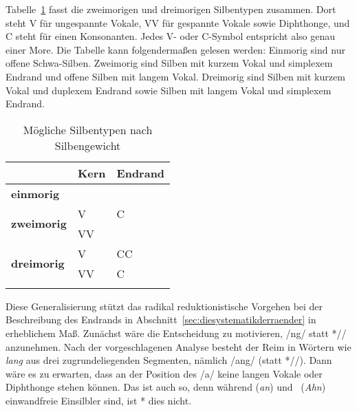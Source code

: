 
Tabelle~\ref{tab:einsilblerundzweisilbler147} fasst die zweimorigen und dreimorigen Silbentypen zusammen.
Dort steht V für ungespannte Vokale, VV für gespannte Vokale sowie Diphthonge, und C steht für einen Konsonanten.
Jedes V- oder C-Symbol entspricht also genau einer More.
Die Tabelle kann folgendermaßen gelesen werden:
Einmorig sind nur offene Schwa-Silben.
Zweimorig sind Silben mit kurzem Vokal und simplexem Endrand und offene Silben mit langem Vokal.
Dreimorig sind Silben mit kurzem Vokal und duplexem Endrand sowie Silben mit langem Vokal und simplexem Endrand.

\begin{table}[!htbp]
  \centering
  \begin{tabular}{lll}
    \lsptoprule
     & \textbf{Kern} & \textbf{Endrand} \\
    \midrule
    \textbf{einmorig} & \textipa{@} & \\
    \midrule
    \multirow{2}{*}{\textbf{zweimorig}} & V & C \\
    & VV & \\
    \midrule
    \multirow{2}{*}{\textbf{dreimorig}} & V & CC \\
    & VV & C \\
    \lspbottomrule
  \end{tabular}
  \caption{Mögliche Silbentypen nach Silbengewicht}
  \label{tab:einsilblerundzweisilbler147}
\end{table}

Diese Generalisierung stützt das radikal reduktionistische Vorgehen bei der Beschreibung des Endrands in Abschnitt~\ref{sec:diesystematikderraender} in erheblichem Maß.
Zunächst wäre die Entscheidung zu motivieren, /ng/ statt *// anzunehmen.
Nach der vorgeschlagenen Analyse besteht der Reim in Wörtern wie \textit{lang} aus drei zugrundeliegenden Segmenten, nämlich /ang/ (statt *//).
Dann wäre es zu erwarten, dass an der Position des /a/ keine langen Vokale oder Diphthonge stehen können.
Das ist auch so, denn während \textipa{[Pan]} (\textit{an}) und\ \textipa{[Pa:n]} (\textit{Ahn}) einwandfreie Einsilbler sind, ist *\textipa{[Pa:N]} dies nicht.

